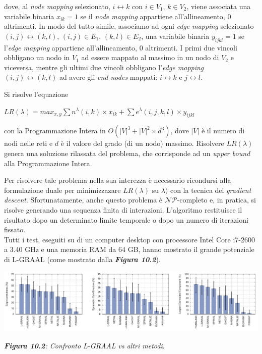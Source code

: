 \documentclass[11pt]{article}
\begin{document}
dove, al \textit{node mapping} selezionato, $i \longleftrightarrow k$ con $i \in V_1$, $k \in V_2$, viene associata una variabile binaria $x_{ik} = 1$ se il \textit{node mapping} appartiene all'allineamento, 0 altrimenti. In modo del tutto simile, associamo ad ogni \textit{edge mapping} selezionato $(i,j) \longleftrightarrow (k,l)$, $(i,j) \in E_1$, $(k,l) \in E_2$, una variabile binaria $y_{ijkl} = 1$ se l'\textit{edge mapping} appartiene all'allineamento, 0 altrimenti. I primi due vincoli obbligano un nodo in $V_1$ ad essere mappato al massimo in un nodo di $V_2$ e viceversa, mentre gli ultimi due vincoli obbligano l'\textit{edge mapping} $(i,j) \longleftrightarrow (k,l)$ ad avere gli \textit{end-nodes} mappati: $i \longleftrightarrow k$ e $j \longleftrightarrow l$.

Si risolve l'equazione
\begin{center}
$LR(\lambda) = max_{x,y} \displaystyle{\sum n^{\lambda}(i,k) \times x_{ik} + \sum e^{\lambda}(i,j,k,l) \times y_{ijkl}}$
\end{center}

con la Programmazione Intera in $O(|V|^3 + |V|^2 \times d^3)$, dove $|V|$ è il numero di nodi nelle reti e $d$ è il valore del grado (di un nodo) massimo. Risolvere $LR(\lambda)$ genera una soluzione rilassata del problema, che corrisponde ad un \textit{upper bound} alla Programmazione Intera. 

Per risolvere tale problema nella sua interezza è necessario ricondursi alla formulazione duale per minimizzazare $LR(\lambda)$ su $\lambda)$ con la tecnica del \textit{gradient descent}. Sfortunatamente, anche questo problema è $\mathcal{NP}$-completo e, in pratica, si risolve generando una sequenza finita di interazioni. L'algoritmo restituisce il risultato dopo un determinato limite temporale o dopo un numero di iterazioni fissato.\\

Tutti i test, eseguiti su di un computer desktop con processore Intel Core i7-2600 a 3.40 GHz e una memoria RAM da 64 GB, hanno mostrato il grande potenziale di L-GRAAL (come mostrato dalla \textit{\textbf{Figura 10.2}}).

\begin{center}
\includegraphics[scale=0.33]{graal2}

\begin{small}\textit{\textbf{Figura 10.2}: Confronto L-GRAAL vs altri metodi}.\end{small}
\end{center}
\end{document}
